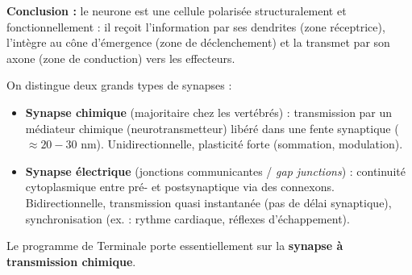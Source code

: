 \documentclass[11pt]{article}
\begin{document}
\begin{exoresolu}
\textbf{Conclusion :} le neurone est une cellule polarisée structuralement et fonctionnellement : il reçoit l'information par ses dendrites (zone réceptrice), l'intègre au cône d'émergence (zone de déclenchement) et la transmet par son axone (zone de conduction) vers les effecteurs.
\end{exoresolu}

\begin{definition}
On distingue deux grands types de synapses :
\begin{itemize}
\item \textbf{Synapse chimique} (majoritaire chez les vertébrés) : transmission par un médiateur chimique (neurotransmetteur) libéré dans une fente synaptique ($\approx 20-30$ nm). Unidirectionnelle, plasticité forte (sommation, modulation).
\item \textbf{Synapse électrique} (jonctions communicantes / \emph{gap junctions}) : continuité cytoplasmique entre pré- et postsynaptique via des connexons. Bidirectionnelle, transmission quasi instantanée (pas de délai synaptique), synchronisation (ex. : rythme cardiaque, réflexes d'échappement).
\end{itemize}
Le programme de Terminale porte essentiellement sur la \textbf{synapse à transmission chimique}.
\end{definition}
\end{document}
